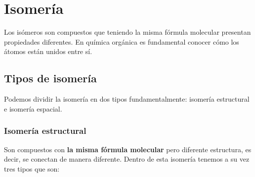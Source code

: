 \vspace*{18pt}

\section{Isomería}

\begin{definition}[Isomería]
    Los isómeros son compuestos que teniendo la misma fórmula molecular presentan propiedades diferentes. En química orgánica es fundamental conocer cómo los átomos están unidos entre sí.
\end{definition}


\subsection{Tipos de isomería}

Podemos dividir la isomería en dos tipos fundamentalmente: isomería estructural e isomería espacial.

\subsubsection{Isomería estructural}

Son compuestos con \textbf{la misma fórmula molecular} pero diferente estructura, es decir, se conectan de manera diferente. Dentro de esta isomería tenemos a su vez tres tipos que son:

